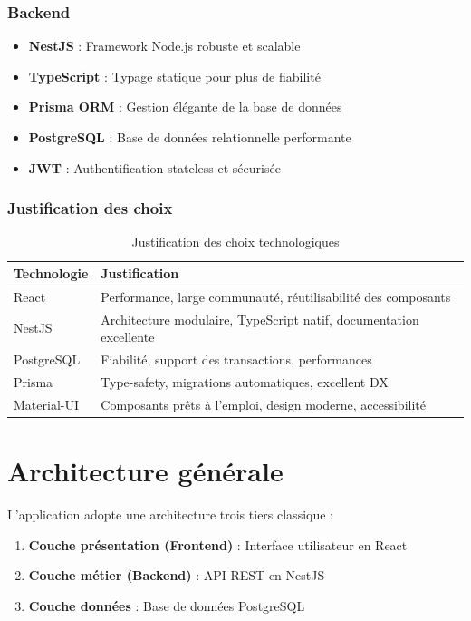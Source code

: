 \documentclass[12pt,a4paper]{report}
\begin{document}
\subsubsection{Backend}

\begin{itemize}
    \item \textbf{NestJS} : Framework Node.js robuste et scalable
    \item \textbf{TypeScript} : Typage statique pour plus de fiabilité
    \item \textbf{Prisma ORM} : Gestion élégante de la base de données
    \item \textbf{PostgreSQL} : Base de données relationnelle performante
    \item \textbf{JWT} : Authentification stateless et sécurisée
\end{itemize}

\subsubsection{Justification des choix}

\begin{table}[H]
\centering
\caption{Justification des choix technologiques}
\begin{tabularx}{\textwidth}{|l|X|}
\hline
\textbf{Technologie} & \textbf{Justification} \\
\hline
React & Performance, large communauté, réutilisabilité des composants \\
\hline
NestJS & Architecture modulaire, TypeScript natif, documentation excellente \\
\hline
PostgreSQL & Fiabilité, support des transactions, performances \\
\hline
Prisma & Type-safety, migrations automatiques, excellent DX \\
\hline
Material-UI & Composants prêts à l'emploi, design moderne, accessibilité \\
\hline
\end{tabularx}
\end{table}

\section{Architecture générale}

L'application adopte une architecture trois tiers classique :

\begin{enumerate}
    \item \textbf{Couche présentation (Frontend)} : Interface utilisateur en React
    \item \textbf{Couche métier (Backend)} : API REST en NestJS
    \item \textbf{Couche données} : Base de données PostgreSQL
\end{enumerate}
\end{document}
